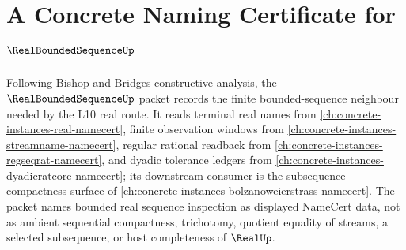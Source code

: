 \chapter{A Concrete Naming Certificate for $\RealBoundedSequenceUp$}
\label{ch:concrete-instances-real-bounded-sequence-namecert}

Following Bishop and Bridges constructive analysis, the $\RealBoundedSequenceUp$ packet records the finite bounded-sequence neighbour needed by the L10 real route. It reads terminal real names from \autoref{ch:concrete-instances-real-namecert}, finite observation windows from \autoref{ch:concrete-instances-streamname-namecert}, regular rational readback from \autoref{ch:concrete-instances-regseqrat-namecert}, and dyadic tolerance ledgers from \autoref{ch:concrete-instances-dyadicratcore-namecert}; its downstream consumer is the subsequence compactness surface of \autoref{ch:concrete-instances-bolzanoweierstrass-namecert}. The packet names bounded real sequence inspection as displayed NameCert data, not as ambient sequential compactness, trichotomy, quotient equality of streams, a selected subsequence, or host completeness of $\RealUp$.

